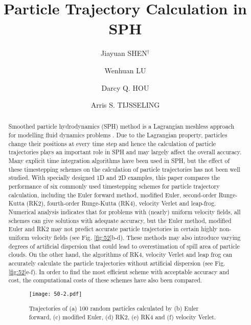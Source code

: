 \documentclass[10pt]{article}
\title{Particle Trajectory Calculation in SPH}
\date{}
\author[1]{Jiayuan SHEN$^\dagger$}
\author[1]{Wenhuan LU}
\author[2]{Darcy Q. HOU}
\author[3]{Arris S. TIJSSELING}
\affil[1]{School of Computer Software, Tianjin University, China}
\affil[2]{School of Computer Science and Technology, Tianjin University, China}
\affil[3]{Department of Mathematics and Computer Science, Eindhoven University of Technology}
\affil[$\relax$]{\email{\dagger}{shenjiayuan@tju.edu.cn}}
\begin{document}
\maketitle


\begin{abstract}
Smoothed particle hydrodynamics (SPH) method is a Lagrangian meshless approach for modelling fluid dynamics problems \cite{liu2003smoothed,violeau2012fluid}. Due to the Lagrangian property, particles change their positions at every time step and hence the calculation of particle trajectories plays an important role in SPH and may largely affect the overall accuracy. Many explicit time integration algorithms have been used in SPH, but the effect of these timestepping schemes on the calculation of particle trajectories has not been well studied. With specially designed 1D and 2D examples, this paper compares the performance of six commonly used timestepping schemes for particle trajectory calculation, including the Euler forward method, modified Euler, second-order Runge-Kutta (RK2), fourth-order Runge-Kutta (RK4), velocity Verlet and leap-frog. Numerical analysis indicates that for problems with (nearly) uniform velocity fields, all schemes can give solutions with adequate accuracy, but the Euler method, modified Euler and RK2 may not predict accurate particle trajectories in certain highly non-uniform velocity fields (see Fig. \ref{fig:52}b-d). These methods may also introduce varying degrees of artificial dispersion that could lead to overestimation of spill area of particle clouds. On the other hand, the algorithms of RK4, velocity Verlet and leap frog can accurately calculate the particle trajectories without artificial dispersion (see Fig. \ref{fig:52}e-f). In order to find the most efficient scheme with acceptable accuracy and cost, the computational costs of these schemes have also been compared.


\begin{figure}[!htb]
\centering
\texttt{[image: 50-2.pdf]}
\caption{Trajectories of (a) 100 random particles calculated by (b) Euler forward, (c) modified Euler, (d) RK2, (e)
RK4 and (f) velocity Verlet.}\label{fig:52}
\end{figure}

\end{abstract}



\addbib
\end{document}
